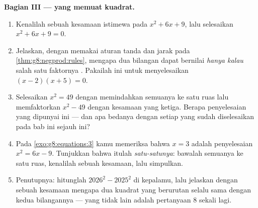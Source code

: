 \begin{problem}[{Soal akhir pekan --- $(a+b)^2$, $(a-b)^2$,
$(a+b)(a-b)$, dan jumlah $1 + 3 + 5 + \dots + (2n-1) = n^2$}]
\medskip
\noindent\textbf{Bagian III ---  yang memuat kuadrat.}
\begin{enumerate}[resume]
  \item Kenalilah sebuah kesamaan istimewa pada $x^2 + 6x + 9$, lalu
        selesaikan  $x^2 + 6x + 9 = 0$.
  \item Jelaskan, dengan memakai aturan tanda dan jarak pada
        \cref{thm:g8:negprod:rules}, mengapa  dua bilangan
        dapat bernilai  \emph{hanya kalau} salah satu faktornya
        . Pakailah ini untuk menyelesaikan $(x - 2)(x + 5) = 0$.
  \item Selesaikan $x^2 = 49$ dengan memindahkan semuanya ke satu
        ruas lalu memfaktorkan $x^2 - 49$ dengan kesamaan yang
        ketiga. Berapa penyelesaian yang dipunyai  ini ---
        dan apa bedanya dengan setiap  yang sudah
        diselesaikan pada bab ini sejauh ini?
  \item Pada \cref{exo:g8:equations:3} kamu memeriksa bahwa $x = 3$
        adalah penyelesaian $x^2 = 6x - 9$. Tunjukkan bahwa itulah
        \emph{satu-satunya}: bawalah semuanya ke satu ruas, kenalilah
        sebuah kesamaan, lalu simpulkan.
  \item Penutupnya: hitunglah $2026^2 - 2025^2$ di kepalamu, lalu
        jelaskan dengan sebuah kesamaan mengapa  dua kuadrat
        yang berurutan selalu sama dengan  kedua bilangannya
        --- yang tidak lain adalah pertanyaan 8 sekali lagi.

\end{enumerate}
\end{problem}
